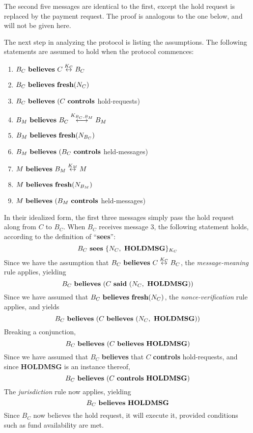 The second five messages are identical to the first, except the hold
request is replaced by the payment request.  The proof is analogous to the
one below, and will not be given here.

The next step in analyzing the protocol is listing the assumptions.  The
following statements are assumed to hold when the protocol commences:
\begin{enumerate}
\item $B_{C}\ {\bf believes}\ C \stackrel{K_{C}}{\leftrightarrow} B_{C}$
\item $B_{C}\ {\bf believes\ fresh}(N_{C})$
\item $B_{C}\ {\bf believes}\ (C\ {\bf controls}\ $hold-requests)
\vspace{.6cm}
\item $B_{M}\ {\bf believes}\ B_{C} \stackrel{K_{B_{C},B_{M}}}{\longleftrightarrow} B_{M}$
\item $B_{M}\ {\bf believes\ fresh}(N_{B_{C}})$
\item $B_{M}\ {\bf believes}\ (B_{C}\ {\bf controls}\ $held-messages)
\vspace{.6cm}
\item $M\ {\bf believes}\ B_{M} \stackrel{K_{M}}{\leftrightarrow} M$
\item $M\ {\bf believes\ fresh}(N_{B_{M}})$
\item $M\ {\bf believes}\ (B_{M}\ {\bf controls}\ $held-messages)
\end{enumerate}

In their idealized form, the first three messages simply pass the hold
request along from $C$ to $B_{C}$.  When $B_{C}$ receives message 3, the
following statement holds, according to the definition of ``{\bf sees}'':
\[B_{C}\ {\bf sees}\ \{N_{C},\ {\bf HOLDMSG}\}_{K_{C}}\]
Since we have the assumption that $B_{C}\ {\bf believes}\ C
\stackrel{K_{C}}{\leftrightarrow} B_{C}$, the {\em message-meaning} rule
applies, yielding
\[B_{C}\ {\bf believes}\ (C\ {\bf said}\ (N_{C},\ {\bf HOLDMSG}))\]
Since we have assumed that $B_{C}\ {\bf believes\ fresh}(N_{C})$, the {\em
nonce-verification} rule applies, and yields
\[B_{C}\ {\bf believes}\ (C\ {\bf believes}\ (N_{C},\ {\bf HOLDMSG}))\]
Breaking a conjunction,
\[B_{C}\ {\bf believes}\ (C\ {\bf believes}\ {\bf HOLDMSG})\]
Since we have assumed that $B_{C}$ {\bf believes} that $C$ {\bf controls}
hold-requests,
and since {\bf HOLDMSG} is an instance thereof,
\[B_{C}\ {\bf believes}\ (C\ {\bf controls}\ {\bf HOLDMSG})\]
The {\em jurisdiction} rule now applies, yielding
\[B_{C}\ {\bf believes}\ {\bf HOLDMSG}\]
Since $B_{C}$ now believes the hold request, it will execute it, provided
conditions such as fund availability are met.


